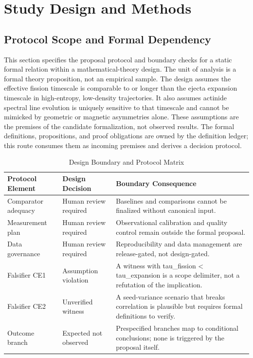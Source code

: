 \documentclass[conference]{IEEEtran}
\begin{document}
\section{Study Design and Methods}
\subsection{Protocol Scope and Formal Dependency}
This section specifies the proposal protocol and boundary checks for a static formal relation within a mathematical-theory design. The unit of analysis is a formal theory proposition, not an empirical sample. The design assumes the effective fission timescale is comparable to or longer than the ejecta expansion timescale in high-entropy, low-density trajectories. It also assumes actinide spectral line evolution is uniquely sensitive to that timescale and cannot be mimicked by geometric or magnetic asymmetries alone. These assumptions are the premises of the candidate formalization, not observed results. The formal definitions, propositions, and proof obligations are owned by the definition ledger; this route consumes them as incoming premises and derives a decision protocol.

\begin{table}[htbp]
\centering
\footnotesize
\setlength{\tabcolsep}{3pt}
\renewcommand{\arraystretch}{1.12}
\caption{Design Boundary and Protocol Matrix}
\label{tab:study-design-and-methods-protocol-matrix}
\begin{tabular}{|p{}|p{}|p{}|}
\hline
Protocol Element & Design Decision & Boundary Consequence \\\hline
Comparator adequacy & Human review required & Baselines and comparisons cannot be finalized without canonical input. \\\hline
Measurement plan & Human review required & Observational calibration and quality control remain outside the formal proposal. \\\hline
Data governance & Human review required & Reproducibility and data management are release-gated, not design-gated. \\\hline
Falsifier CE1 & Assumption violation & A witness with tau\_fission < tau\_expansion is a scope delimiter, not a refutation of the implication. \\\hline
Falsifier CE2 & Unverified witness & A seed-variance scenario that breaks correlation is plausible but requires formal definitions to verify. \\\hline
Outcome branch & Expected not observed & Prespecified branches map to conditional conclusions; none is triggered by the proposal itself. \\\hline
\end{tabular}
\end{table}
\end{document}
